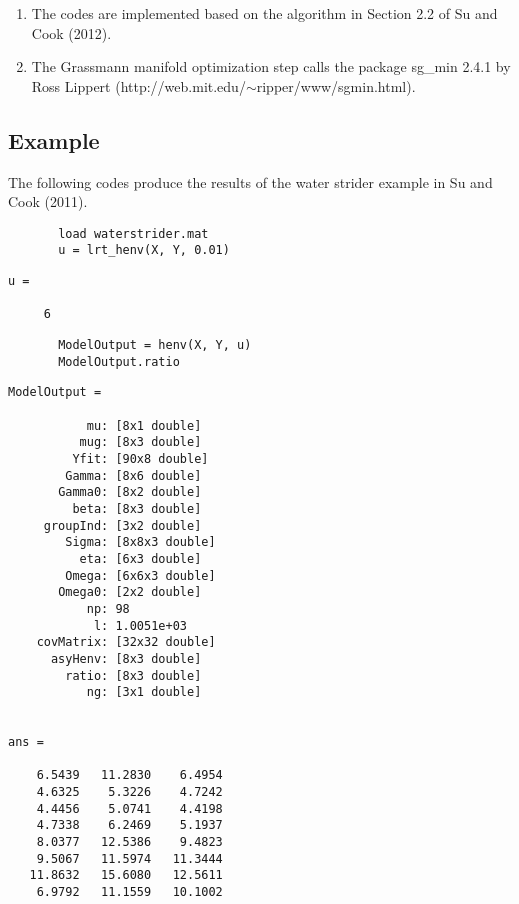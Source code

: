 \documentclass[a4paper,11pt,openany]{memoir}
\begin{document}
\begin{enumerate}
\setlength{\itemsep}{-1ex}
   \item The codes are implemented based on the algorithm in Section 2.2 of Su and Cook (2012).
   \item The Grassmann manifold optimization step calls the package sg\_min 2.4.1 by Ross Lippert (http://web.mit.edu/$\sim$ripper/www/sgmin.html).
\end{enumerate}


\subsection*{Example}

\begin{par}
The following codes produce the results of the water strider example in Su and Cook (2011).
\end{par} \vspace{1em}

\begin{verbatim}       load waterstrider.mat
       u = lrt_henv(X, Y, 0.01)
       \end{verbatim}
               \color{lightgray}\ttfamily \begin{verbatim}
u =

     6
\end{verbatim} \rmfamily
\color{black}
\begin{verbatim}       ModelOutput = henv(X, Y, u)
       ModelOutput.ratio\end{verbatim}

 \color{lightgray}\ttfamily \begin{verbatim}
ModelOutput = 

           mu: [8x1 double]
          mug: [8x3 double]
         Yfit: [90x8 double]
        Gamma: [8x6 double]
       Gamma0: [8x2 double]
         beta: [8x3 double]
     groupInd: [3x2 double]
        Sigma: [8x8x3 double]
          eta: [6x3 double]
        Omega: [6x6x3 double]
       Omega0: [2x2 double]
           np: 98
            l: 1.0051e+03
    covMatrix: [32x32 double]
      asyHenv: [8x3 double]
        ratio: [8x3 double]
           ng: [3x1 double]


ans =

    6.5439   11.2830    6.4954
    4.6325    5.3226    4.7242
    4.4456    5.0741    4.4198
    4.7338    6.2469    5.1937
    8.0377   12.5386    9.4823
    9.5067   11.5974   11.3444
   11.8632   15.6080   12.5611
    6.9792   11.1559   10.1002

\end{verbatim} \rmfamily
\color{black}
    
\end{document}
